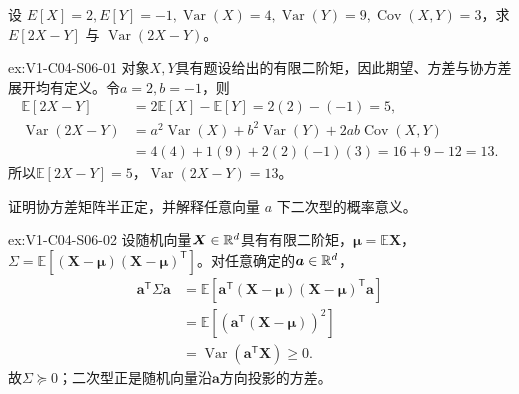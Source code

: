 \begin{SLChapterExercisePairSection}
\begin{exercise}\label{ex:V1-C04-S06-01}
设 $E[X]=2,E[Y]=-1,\operatorname{Var}(X)=4,\operatorname{Var}(Y)=9,\operatorname{Cov}(X,Y)=3$，求 $E[2X-Y]$ 与 $\operatorname{Var}(2X-Y)$。
\end{exercise}
\label{sol:V1-C04-S06-01}
\begin{chapterexercisesolution}{ex:V1-C04-S06-01}
对象$X,Y$具有题设给出的有限二阶矩，因此期望、方差与协方差展开均有定义。令$a=2,b=-1$，则
\[
\begin{aligned}
\mathbb E[2X-Y]&=2\mathbb E[X]-\mathbb E[Y]
=2(2)-(-1)=5,\\
\operatorname{Var}(2X-Y)
&=a^2\operatorname{Var}(X)+b^2\operatorname{Var}(Y)
+2ab\operatorname{Cov}(X,Y)\\
&=4(4)+1(9)+2(2)(-1)(3)=16+9-12=13.
\end{aligned}
\]
所以$\mathbb E[2X-Y]=5$，$\operatorname{Var}(2X-Y)=13$。
\end{chapterexercisesolution}

\begin{exercise}\label{ex:V1-C04-S06-02}
证明协方差矩阵半正定，并解释任意向量 $a$ 下二次型的概率意义。
\end{exercise}
\label{sol:V1-C04-S06-02}
\begin{chapterexercisesolution}{ex:V1-C04-S06-02}
设随机向量$\boldsymbol X\in\mathbb{R}^d$具有有限二阶矩，$\boldsymbol\mu=\mathbb E\boldsymbol X$，$\Sigma=\mathbb E[(\boldsymbol X-\boldsymbol\mu)(\boldsymbol X-\boldsymbol\mu)^{\mathsf T}]$。对任意确定的$\boldsymbol a\in\mathbb{R}^d$，
\[
\begin{aligned}
\boldsymbol a^{\mathsf T}\Sigma\boldsymbol a
&=\mathbb E\!\left[
\boldsymbol a^{\mathsf T}(\boldsymbol X-\boldsymbol\mu)
(\boldsymbol X-\boldsymbol\mu)^{\mathsf T}\boldsymbol a\right]\\
&=\mathbb E\!\left[(\boldsymbol a^{\mathsf T}(\boldsymbol X-\boldsymbol\mu))^2\right]\\
&=\operatorname{Var}(\boldsymbol a^{\mathsf T}\boldsymbol X)\ge0.
\end{aligned}
\]
故$\Sigma\succeq0$；二次型正是随机向量沿$\boldsymbol a$方向投影的方差。
\end{chapterexercisesolution}


\end{SLChapterExercisePairSection}
